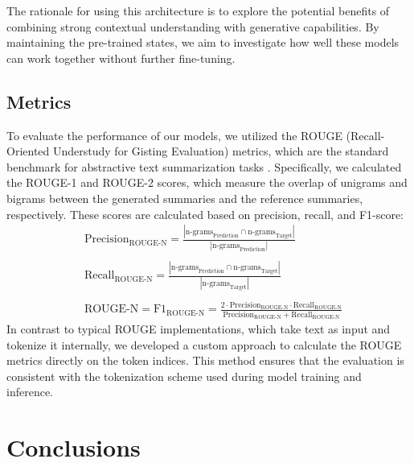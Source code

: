 \documentclass[a4paper, 11pt]{article}
\begin{document}
The rationale for using this architecture is to explore the potential benefits of combining strong contextual understanding with generative capabilities. By maintaining the pre-trained states, we aim to investigate how well these models can work together without further fine-tuning.

\subsection{Metrics}
To evaluate the performance of our models, we utilized the ROUGE (Recall-Oriented Understudy for Gisting Evaluation) metrics, which are the standard benchmark for abstractive text summarization tasks \cite{abstCNN}. Specifically, we calculated the ROUGE-1 and ROUGE-2 scores, which measure the overlap of unigrams and bigrams between the generated summaries and the reference summaries, respectively. These scores are calculated based on precision, recall, and F1-score:
\begin{equation}
    \begin{split}
        &\text{Precision}_{\text{ROUGE-N}} = \frac{|\text{n-grams}_{\text{Prediction}} \cap \text{n-grams}_{\text{Target}}|}{|\text{n-grams}_{\text{Prediction}}|}
        \\\\
        &\text{Recall}_{\text{ROUGE-N}} = \frac{|\text{n-grams}_{\text{Prediction}} \cap \text{n-grams}_{\text{Target}}|}{|\text{n-grams}_{\text{Target}}|}
        \\\\
        &\text{ROUGE-N} = \text{F1}_{\text{ROUGE-N}} = \frac{2 \cdot \text{Precision}_{\text{ROUGE-N}} \cdot \text{Recall}_{\text{ROUGE-N}}}{\text{Precision}_{\text{ROUGE-N}} + \text{Recall}_{\text{ROUGE-N}}}
    \end{split}
\end{equation}
In contrast to typical ROUGE implementations, which take text as input and tokenize it internally, we developed a custom approach to calculate the ROUGE metrics directly on the token indices. This method ensures that the evaluation is consistent with the tokenization scheme used during model training and inference.

\clearpage{}


\clearpage{}


\clearpage{}
\section{Conclusions}
\end{document}
